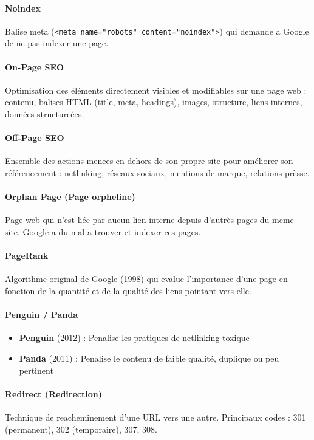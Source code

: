 \documentclass[12pt,a4paper,twoside]{report}
\begin{document}
\paragraph*{Noindex}
Balise meta (\texttt{<meta name="robots" content="noindex">}) qui demande a Google de ne pas indexer une page.

\paragraph*{On-Page SEO}
Optimisation des éléments directement visibles et modifiables sur une page web : contenu, balises HTML (title, meta, headings), images, structure, liens internes, données structureées.

\paragraph*{Off-Page SEO}
Ensemble des actions menees en dehors de son propre site pour améliorer son référencement : netlinking, réseaux sociaux, mentions de marque, relations prèsse.

\paragraph*{Orphan Page (Page orpheline)}
Page web qui n'est liée par aucun lien interne depuis d'autrès pages du meme site. Google a du mal a trouver et indexer ces pages.

\paragraph*{PageRank}
Algorithme original de Google (1998) qui evalue l'importance d'une page en fonction de la quantité et de la qualité des liens pointant vers elle.

\paragraph*{Penguin / Panda}
\begin{itemize}
    \item \textbf{Penguin} (2012) : Penalise les pratiques de netlinking toxique
    \item \textbf{Panda} (2011) : Penalise le contenu de faible qualité, duplique ou peu pertinent
\end{itemize}

\paragraph*{Redirect (Redirection)}
Technique de reacheminement d'une URL vers une autre. Principaux codes : 301 (permanent), 302 (temporaire), 307, 308.
\end{document}
